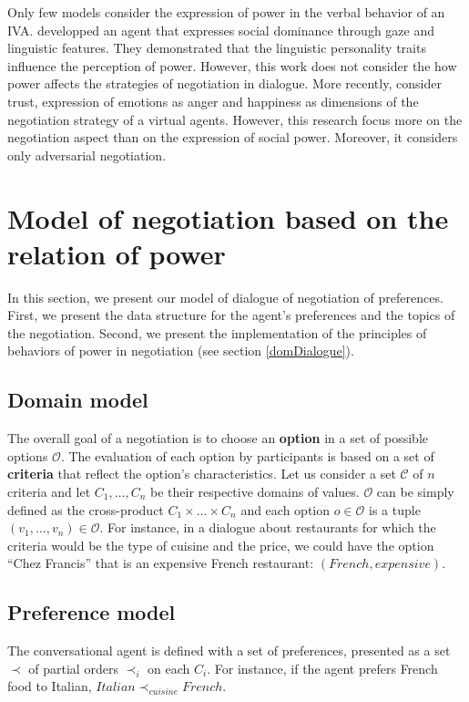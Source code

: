 \documentclass{llncs}
\begin{document}
	Only few models consider the expression of power in the verbal behavior of an IVA. \cite{bee2010bossy} developped an agent that expresses social dominance through gaze and linguistic features. They demonstrated that the linguistic personality traits influence the perception of power. However, this work does not consider the how power affects the strategies of negotiation in dialogue. More recently, \cite{traum2008multi,de2011effect,de2015humans}consider trust, expression of emotions as anger and happiness as dimensions of the negotiation strategy of a virtual agents. However, this research focus more on the negotiation aspect than on the expression of social power. Moreover, it considers only adversarial negotiation.
	
	
	\section{Model of negotiation based on the relation of power}
	In this section, we present our model of dialogue of negotiation of preferences.	
	First, we present the data structure for the agent's preferences and the topics of the negotiation. Second, we present the implementation of the principles of behaviors of power in negotiation (see section \ref{domDialogue}).

	\subsection{Domain model}
	The overall goal of a negotiation is to choose an \textbf{option} in a set of possible options $\mathcal{O}$. The evaluation of each option by participants is based on a set of \textbf{criteria} that reflect the option's characteristics. Let us consider a set $\mathcal{C}$ of $n$ criteria and let $C_1,\ldots,C_n$ be their respective domains of values. $\mathcal{O}$ can be simply defined as the cross-product $C_1\times\ldots\times C_n$ and each option $o\in\mathcal{O}$ is a tuple $(v_1,\ldots,v_n)\in\mathcal{O}$. For instance, in a dialogue about restaurants for which the criteria would be the type of cuisine and the price, we could have the option ``Chez Francis'' that is an expensive French restaurant: $(French,expensive)$.
	
	\subsection{Preference model} 
	The conversational agent is defined with a set of preferences, presented as a set $\prec$ of partial orders $\prec_i$ on each $C_i$. For instance, if the agent prefers French food to Italian, $Italian\prec_{cuisine}French$.
	
\end{document}
